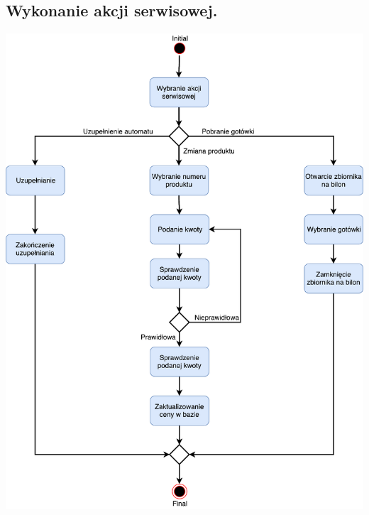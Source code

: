 \documentclass[11pt]{article}
\begin{document}
		\subsection{Wykonanie akcji serwisowej.}
		\begin{center}
			\includegraphics[scale=0.7]{czynnosci2.pdf}
		\end{center}
\end{document}

